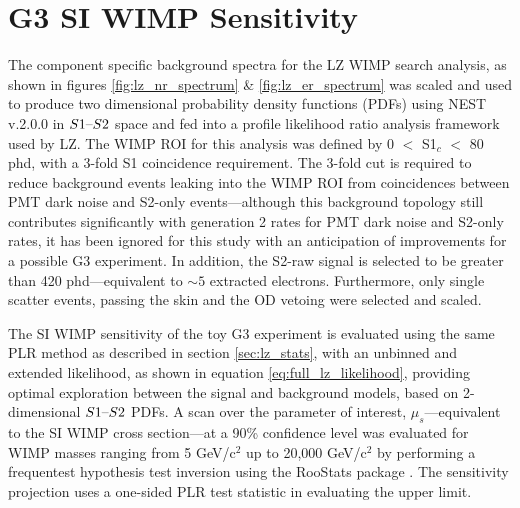 %

%

\section{G3 SI WIMP Sensitivity}
\label{sec:g3_sensitivity}


The component specific background spectra for the LZ WIMP search analysis, as shown in figures \ref{fig:lz_nr_spectrum} \& \ref{fig:lz_er_spectrum} was scaled and used to produce two dimensional probability density functions (PDFs) using NEST v.2.0.0 in $S1\text{--}{}S2$ space and fed into a profile likelihood ratio analysis framework used by LZ. The WIMP ROI for this analysis was defined by 0 $<$ S1$_{c}$ $<$ 80 phd, with a 3-fold S1 coincidence requirement. The 3-fold cut is required to reduce background events leaking into the WIMP ROI from coincidences between PMT dark noise and S2-only events---although this background topology still contributes significantly with generation 2 rates for PMT dark noise and S2-only rates, it has been ignored for this study with an anticipation of improvements for a possible G3 experiment. In addition, the S2-raw signal is selected to be greater than 420 phd---equivalent to $\sim5$ extracted electrons. Furthermore, only single scatter events, passing the skin and the OD vetoing were selected and scaled. 

The SI WIMP sensitivity of the toy G3 experiment is evaluated using the same PLR method as described in section \ref{sec:lz_stats}, with an unbinned and extended likelihood, as shown in equation \ref{eq:full_lz_likelihood}, providing optimal exploration between the signal and background models, based on 2-dimensional $S1\text{--}{}S2$ PDFs. A scan over the parameter of interest, $\mu_{s}$---equivalent to the SI WIMP cross section---at a 90\% confidence level was evaluated for WIMP masses ranging from 5 GeV/c$^{2}$ up to 20,000 GeV/c$^{2}$ by performing a frequentest hypothesis test inversion using the RooStats package \cite{moneta2010roostats}. The sensitivity projection uses a one-sided PLR test statistic in evaluating the upper limit. 


